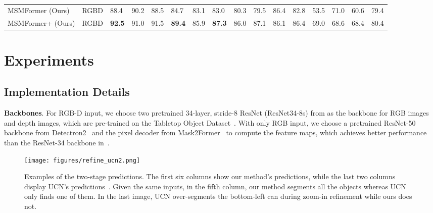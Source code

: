 \documentclass[letterpaper, 10 pt, conference]{ieeeconf}
\begin{document}
\begin{table*}
{\begin{tabular}{|l|l|lllllll|lllllll|}
MSMFormer (Ours)                                         & RGBD                   & 88.4                  & 90.2                  & \multicolumn{1}{l|}{88.5}          & 84.7                  & 83.1                  & \multicolumn{1}{l|}{83.0}          & 80.3          & 79.5                  & 86.4                  & \multicolumn{1}{l|}{82.8}          & 53.5                  & 71.0                  & \multicolumn{1}{l|}{60.6}          & 79.4          \\




MSMFormer+ (Ours)                                        & RGBD                   & \textbf{92.5}         & 91.0                  & \multicolumn{1}{l|}{91.5}          & \textbf{89.4}         & 85.9                  & \multicolumn{1}{l|}{\textbf{87.3}} & 86.0          & 87.1                  & 86.1                  & \multicolumn{1}{l|}{86.4}          & 69.0                  & 68.6                  & \multicolumn{1}{l|}{68.4}          & 80.4          \\ \hline



\end{tabular}
}
\end{table*}


\section{Experiments}



\subsection{Implementation Details}
\vspace{-1mm}
\textbf{Backbones}. For RGB-D input, we choose two pretrained 34-layer, stride-8 ResNet (ResNet34-8s) from \cite{xiang2020learning} as the backbone for RGB images and depth images, which are pre-trained on the  Tabletop Object Dataset~\cite{xie2019object}. With only RGB input, we choose a pretrained ResNet-50 backbone from Detectron2~\cite{wu2019detectron2} and the pixel decoder from Mask2Former~\cite{cheng2022masked} to compute the feature maps, which achieves better performance than the ResNet-34 backbone in~\cite{xiang2020learning}.

\begin{figure*}[ht]
    \centering
    \texttt{[image: figures/refine\_ucn2.png]}
    \vspace{-5mm}
    \caption{\small Examples of the two-stage predictions. The first six columns show our method's predictions, while the last two columns display UCN's predictions~\cite{xiang2020learning}. Given the same inputs, in the fifth column, our method segments all the objects whereas UCN only finds one of them. In the last image, UCN over-segments the bottom-left can during zoom-in refinement while ours does not.}
    \label{fig:refine}
    \vspace{-6mm}
\end{figure*}
\end{document}
